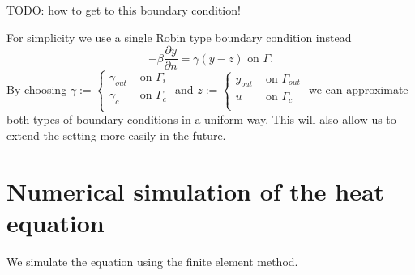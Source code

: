\documentclass[
12pt, %
a4paper, %
onecolumn, %
portrait %
]{article}
\begin{document}
TODO: how to get to this boundary condition!

For simplicity we use a single Robin type boundary condition instead
\begin{equation}
- \beta \frac{\partial y}{\partial n} = \gamma (y - z) \text{ on } \Gamma.
\label{eq:robin-bc}
\end{equation}
By choosing 
$\gamma := \begin{cases}
\gamma_{out} &\text{ on } \Gamma_i \\ 
\gamma_c &\text{ on } \Gamma_c \\
\end{cases}
$
and
$z := \begin{cases}
y_{out} &\text{ on } \Gamma_{out} \\ 
u &\text{ on } \Gamma_c \\
\end{cases}
$
we can approximate both types of boundary conditions in a uniform way. 
This will also allow us to extend the setting more easily in the future.
\section{Numerical simulation of the heat equation}
We simulate the equation using the finite element method.
\end{document}
